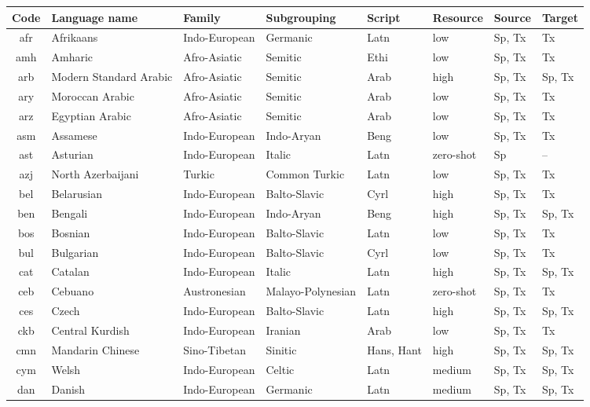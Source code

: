 \begin{table}[!p]\centering\centering\scriptsize\begin{tabular}{clllllll}
\toprule
\textbf{Code} & \textbf{Language name} & \textbf{Family} & \textbf{Subgrouping} & \textbf{Script} & \textbf{Resource} & \textbf{Source} & \textbf{Target} \\
\midrule
afr & Afrikaans & Indo-European & Germanic & Latn & low & Sp, Tx & Tx \\
amh & Amharic & Afro-Asiatic & Semitic & Ethi & low & Sp, Tx & Tx \\
arb & Modern Standard Arabic & Afro-Asiatic & Semitic & Arab & high & Sp, Tx & Sp, Tx \\
ary & Moroccan Arabic & Afro-Asiatic & Semitic & Arab & low & Sp, Tx & Tx \\
arz & Egyptian Arabic & Afro-Asiatic & Semitic & Arab & low & Sp, Tx & Tx \\
asm & Assamese & Indo-European & Indo-Aryan & Beng & low & Sp, Tx & Tx \\
ast & Asturian & Indo-European & Italic & Latn & zero-shot & Sp & -- \\
azj & North Azerbaijani & Turkic & Common Turkic & Latn & low & Sp, Tx & Tx \\
bel & Belarusian & Indo-European & Balto-Slavic & Cyrl & high & Sp, Tx & Tx \\
ben & Bengali & Indo-European & Indo-Aryan & Beng & high & Sp, Tx & Sp, Tx \\
bos & Bosnian & Indo-European & Balto-Slavic & Latn & low & Sp, Tx & Tx \\
bul & Bulgarian & Indo-European & Balto-Slavic & Cyrl & low & Sp, Tx & Tx \\
cat & Catalan & Indo-European & Italic & Latn & high & Sp, Tx & Sp, Tx \\
ceb & Cebuano & Austronesian & Malayo-Polynesian & Latn & zero-shot & Sp, Tx & Tx \\
ces & Czech & Indo-European & Balto-Slavic & Latn & high & Sp, Tx & Sp, Tx \\
ckb & Central Kurdish & Indo-European & Iranian & Arab & low & Sp, Tx & Tx \\
cmn & Mandarin Chinese & Sino-Tibetan & Sinitic & Hans, Hant & high & Sp, Tx & Sp, Tx \\
cym & Welsh & Indo-European & Celtic & Latn & medium & Sp, Tx & Sp, Tx \\
dan & Danish & Indo-European & Germanic & Latn & medium & Sp, Tx & Sp, Tx \\

\end{tabular}
\end{table}

